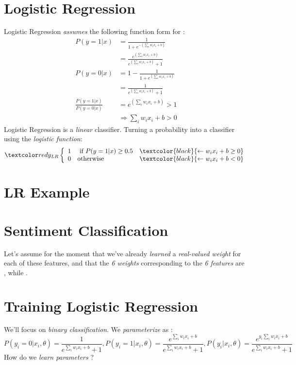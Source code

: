 \documentclass[
	title={Logistic Regression}
]{cs584notes}
\begin{document}
\section{Logistic Regression}\label{sec:logistic-regression}
Logistic Regression \emph{assumes} the following function form for :
\data{\[ P(y=1|x) = \frac{1}{1+e^{-\left( \sum_{i}w_{i}x_{i} + b \right)}} \]}
\begin{equation*}
\begin{aligned}
	P(y=1|x) &= \frac{1}{1+e^{-\left( \sum_{i}w_{i}x_{i} + b \right)}}\\
			 &= \frac{e^{\left( \sum_{i}w_{i}x_{i} + b \right)}}{e^{\left( \sum_{i}w_{i}x_{i} + b \right)} + 1}\\
	P(y=0|x) &= 1 - \frac{1}{1+e^{\left( \sum_{i}w_{i}x_{i} + b \right)}}\\
			 &= \frac{1}{e^{\left( \sum_{i}w_{i}x_{i} + b \right)} + 1}\\
	\frac{P(y=1|x)}{P(y=0|x)} &= e^{\left( \sum_{i}w_{i}x_{i} + b \right)} > 1\\
	&\Rightarrow \sum_{i} w_{i}x_{i} + b > 0
\end{aligned}
\end{equation*}
Logistic Regression is a \emph{linear} classifier.
Turning a probability into a classifier using the \emph{logistic function}:
\[ \data{ y_{LR}\left\{ \begin{array}{clr}
	1 & \mbox{ if } P(y=1|x) \geq 0.5 & \textcolor{black}{\leftarrow w_{i}x_{i} + b \geq 0}\\
	0 & \mbox{otherwise} & \textcolor{black}{\leftarrow w_{i}x_{i} + b < 0}
\end{array} \right. } \]

\section{LR Example}\label{sec:lr-example}

\section{Sentiment Classification}\label{sec:sentiment-classification}
Let's assume for the moment that we've already \emph{learned} a \emph{real-valued weight} for each of these features, and that the \emph{6 weights} corresponding to the \emph{6 features} are \data{$[2.5, -5.0, -1.2, 0.5, 2.0, 0.7]$}, while .

\section{Training Logistic Regression}\label{sec:training-logistic-regression}
We'll focus on \emph{binary classification}.
We \emph{parameterize}  as \data{$\theta$}:
\[ P(y_{i} = 0|x_{i},\theta) = \frac{1}{e^{\sum_{i} w_{i}x_{i} + b}+1}, P(y_{i} = 1|x_{i},\theta) = \frac{e^{\sum_{i} w_{i}x_{i} + b}}{e^{\sum_{i} w_{i}x_{i} + b}+1}, P(y_{i}|x_{i},\theta) = \frac{e^{y_{i}\sum_{i} w_{i}x_{i} + b}}{e^{\sum_{i} w_{i}x_{i} + b}+1} \]
How do we \emph{learn parameters} \data{$\theta$}?
\end{document}
